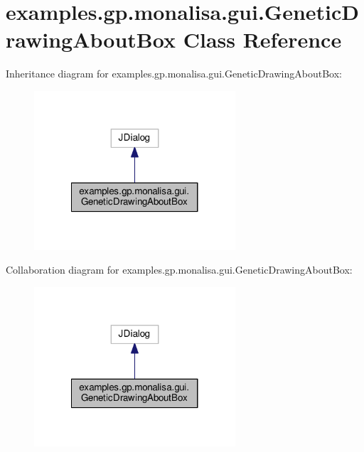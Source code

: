 \hypertarget{classexamples_1_1gp_1_1monalisa_1_1gui_1_1_genetic_drawing_about_box}{\section{examples.\-gp.\-monalisa.\-gui.\-Genetic\-Drawing\-About\-Box Class Reference}
\label{classexamples_1_1gp_1_1monalisa_1_1gui_1_1_genetic_drawing_about_box}
}


Inheritance diagram for examples.\-gp.\-monalisa.\-gui.\-Genetic\-Drawing\-About\-Box\-:
\nopagebreak
\begin{figure}[H]
\begin{center}
\leavevmode
\includegraphics[width=212pt]{classexamples_1_1gp_1_1monalisa_1_1gui_1_1_genetic_drawing_about_box__inherit__graph}
\end{center}
\end{figure}


Collaboration diagram for examples.\-gp.\-monalisa.\-gui.\-Genetic\-Drawing\-About\-Box\-:
\nopagebreak
\begin{figure}[H]
\begin{center}
\leavevmode
\includegraphics[width=212pt]{classexamples_1_1gp_1_1monalisa_1_1gui_1_1_genetic_drawing_about_box__coll__graph}
\end{center}
\end{figure}
